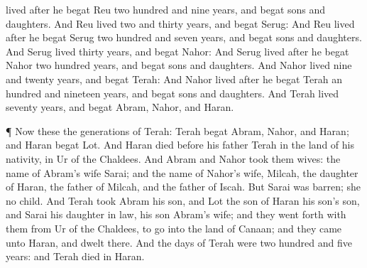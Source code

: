 {lived
after he
begat
Reu two
hundred and
nine
years, and
begat
sons and
daughters.
And
Reu
lived
two and
thirty
years, and
begat
Serug:
And
Reu
lived
after he
begat
Serug two
hundred and
seven
years, and
begat
sons and
daughters.
And
Serug
lived
thirty
years, and
begat
Nahor:
And
Serug
lived
after he
begat
Nahor two
hundred
years, and
begat
sons and
daughters.
And
Nahor
lived
nine and
twenty
years, and
begat
Terah:
And
Nahor
lived
after he
begat
Terah an
hundred and
nineteen
years, and
begat
sons and
daughters.
And
Terah
lived
seventy
years, and
begat
Abram,
Nahor, and
Haran.
\par }{\PP {}¶ Now these
{} the
generations of
Terah:
Terah
begat
Abram,
Nahor, and
Haran; and
Haran
begat
Lot.
And
Haran
died
before his
father
Terah in the
land of his
nativity, in
Ur of the
Chaldees.
And
Abram and
Nahor
took them
wives: the
name of
Abram’s
wife
{}
Sarai; and the
name of
Nahor’s
wife,
Milcah, the
daughter of
Haran, the
father of
Milcah, and the
father of
Iscah.
But
Sarai was
barren; she
{} no
child.
And
Terah
took
Abram his
son, and
Lot the
son of
Haran his
son’s
son, and
Sarai his daughter in
law, his
son
Abram’s
wife; and they went
forth with them from
Ur of the
Chaldees, to
go into the
land of
Canaan; and they
came unto
Haran, and
dwelt there.
And the
days of
Terah were two
hundred and
five
years: and
Terah
died in
Haran.

}
